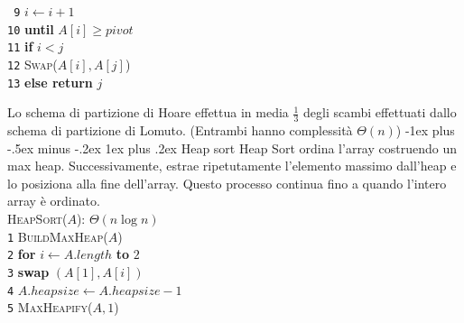 \documentclass[10pt,landscape]{article}
\makeatletter
\renewcommand{\subsubsection}{\@startsection{subsubsection}{3}{0mm}%
                                {-1ex plus -.5ex minus -.2ex}%
                                {1ex plus .2ex}%
                                {\normalfont\normalsize\bfseries}}
\makeatother
\begin{document}
\begin{multicols*}{4}
\begin{multicols}{2}
                        \verb| 9|\hspace*{2.5em} $i \leftarrow i + 1$\\
                        \verb|10|\hspace*{2.5em} \textbf{until} $A[i] \ge pivot$\\
                        \verb|11|\hspace*{1.5em} \textbf{if} $i < j$\\
                        \verb|12|\hspace*{2.5em} \textsc{Swap}($A[i], A[j]$)\\
                        \verb|13|\hspace*{1.5em} \textbf{else return} $j$\\
                \end{multicols}
                Lo schema di partizione di Hoare effettua in media $\frac{1}{3}$ degli scambi effettuati dallo schema di partizione di Lomuto. (Entrambi hanno complessità $\Theta(n)$)
                \subsubsection{Heap sort}
                Heap Sort ordina l'array costruendo un max heap. Successivamente, estrae ripetutamente l'elemento massimo dall'heap e lo posiziona alla fine dell'array. Questo processo continua fino a quando l'intero array è ordinato. \\ [3pt]
                \textsc{HeapSort($A$)}: $\Theta(n \log n)$\\ [3pt]
                \verb|1|\hspace*{0.5em} \textsc{BuildMaxHeap}($A$)\\
                \verb|2|\hspace*{0.5em} \textbf{for} $i \leftarrow A.length$ \textbf{to} $2$\\
                \verb|3|\hspace*{1.5em} \textbf{swap} $(A[1],A[i])$\\
                \verb|4|\hspace*{1.5em} $A.heapsize \leftarrow A.heapsize - 1$\\
                \verb|5|\hspace*{1.5em} \textsc{MaxHeapify}($A, 1$)\\

\end{multicols*}
\end{document}
